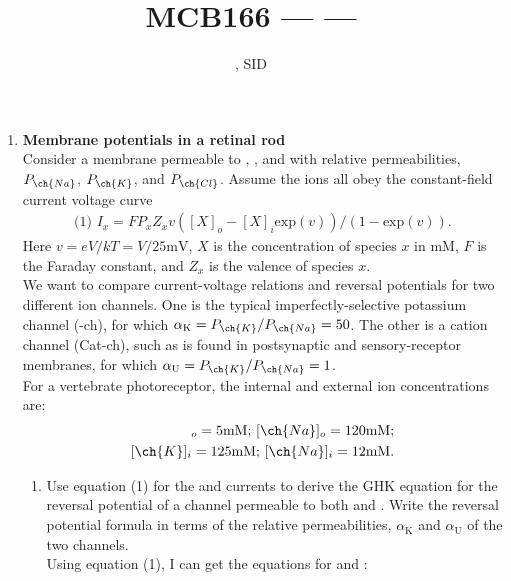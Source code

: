 \documentclass[11pt]{article}
\title{MCB166 --- \Session --- \Homework}
\author{\Name, SID \SID}
\date{\displaydate{date}}
\begin{document}
\maketitle

\newpage
\begin{enumerate}[label=\arabic*.]
\item
\textbf{Membrane potentials in a retinal rod}
\vspace*{1\baselineskip}
\\
Consider a membrane permeable to , , and  with relative permeabilities, $P_{\ch{Na}}$, $P_{\ch{K}}$, and $P_{\ch{Cl}}$. Assume the ions all obey the constant-field current voltage curve
\begin{align*}
\text{(1) }I_x = F P_x Z_x v \left([X]_o - [X]_i \text{exp}(v)\right) / (1 - \text{exp}(v)).
\end{align*}
Here $v = eV / kT = V / 25 \text{mV}$, $X$ is the concentration of species $x$ in mM, $F$ is the Faraday constant, and $Z_x$ is the valence of species $x$.
\vspace*{1\baselineskip}
\\
We want to compare current-voltage relations and reversal potentials for two different ion channels. One is the typical imperfectly-selective potassium channel (-ch), for which $\alpha_{\text{K}} = P_{\ch{K}} / P_{\ch{Na}} = 50$. The other is a cation channel (Cat-ch), such as is found in postsynaptic and sensory-receptor membranes, for which $\alpha_{\text{U}} = P_{\ch{K}} / P_{\ch{Na}} = 1$.
\vspace*{1\baselineskip}
\\
For a vertebrate photoreceptor, the internal and external ion concentrations are:
\begin{align*}
[\ch{K}]_o = 5 \text{mM; } [\ch{Na}]_o = 120 \text{mM;} \\
[\ch{K}]_i = 125 \text{mM; } [\ch{Na}]_i = 12 \text{mM.}
\end{align*}
\begin{enumerate}[label=(\alph*)]
\item
Use equation (1) for the  and  currents to derive the GHK equation for the reversal potential of a channel permeable to both  and . Write the reversal potential formula in terms of the relative permeabilities, $\alpha_{\text{K}}$ and $\alpha_{\text{U}}$ of the two channels.
\vspace*{1\baselineskip}
\\
Using equation (1), I can get the equations for  and :

\end{enumerate}
\end{enumerate}
\end{document}
